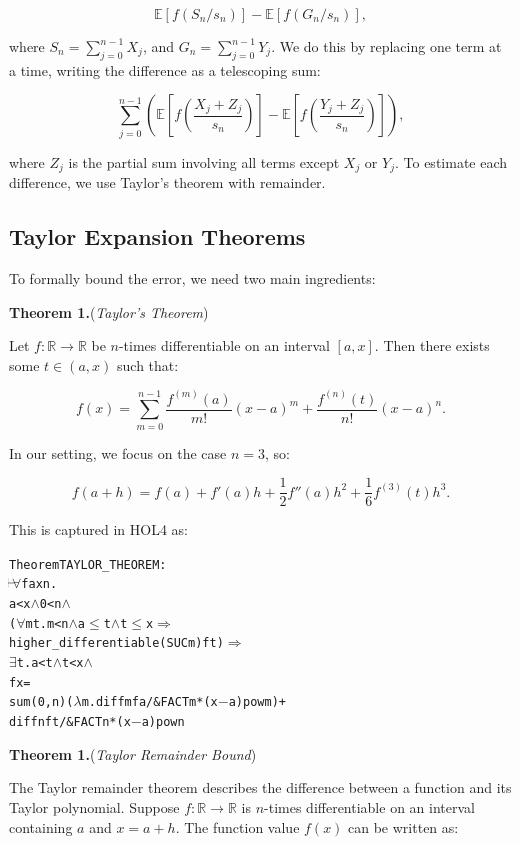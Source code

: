 \[
\mathbb{E}[f(S_n / s_n)] - \mathbb{E}[f(G_n / s_n)],
\]

where $S_n = \sum_{j=0}^{n-1} X_j$, and $G_n = \sum_{j=0}^{n-1} Y_j$. We do this by replacing one term at a time, writing the difference as a telescoping sum:

\[
\sum_{j=0}^{n-1} \left(
\mathbb{E}\left[f\left(\frac{X_j + Z_j}{s_n}\right)\right]
-
\mathbb{E}\left[f\left(\frac{Y_j + Z_j}{s_n}\right)\right]
\right),
\]

where $Z_j$ is the partial sum involving all terms except $X_j$ or $Y_j$.
To estimate each difference, we use Taylor's theorem with remainder.


\subsection{Taylor Expansion Theorems}

To formally bound the error, we need two main ingredients:

\textbf{Theorem 1.}(\emph{Taylor’s Theorem})

Let $f : \mathbb{R} \to \mathbb{R}$ be $n$-times differentiable on an interval $[a, x]$. Then there exists some $t \in (a, x)$ such that:

\[
f(x) =
\sum_{m=0}^{n-1} \frac{f^{(m)}(a)}{m!} (x - a)^m +
\frac{f^{(n)}(t)}{n!} (x - a)^n.
\]

In our setting, we focus on the case $n = 3$, so:

\[
f(a + h) =
f(a) + f'(a)h + \frac{1}{2}f''(a)h^2 + \frac{1}{6}f^{(3)}(t)h^3.
\]

This is captured in HOL4 as:

\begin{hol}
  \begin{alltt}
    Theorem TAYLOR\_THEOREM :
    \(\!\!\!{\turn}\!\!\!\!\) \(\forall\)f a x n.
    a < x \(\land\) 0 < n \(\land\)
    (\(\forall\)m t. m < n \(\land\) a \(\le\) t \(\land\) t \(\le\) x \(\Rightarrow\)
    higher\_differentiable (SUC m) f t) \(\Rightarrow\)
    \(\exists\)t. a < t \(\land\) t < x \(\land\)
    f x =
    sum (0,n) (\(\lambda\)m. diff m f a / \&FACT m * (x \({-}\) a) pow m) +
    diff n f t / \&FACT n * (x \({-}\) a) pow n
  \end{alltt}
\end{hol}

\textbf{Theorem 1.}(\emph{Taylor Remainder Bound})

The Taylor remainder theorem describes the difference between a function and its Taylor polynomial. Suppose $f : \mathbb{R} \to \mathbb{R}$ is $n$-times differentiable on an interval containing $a$ and $x = a + h$. The function value $f(x)$ can be written as:

